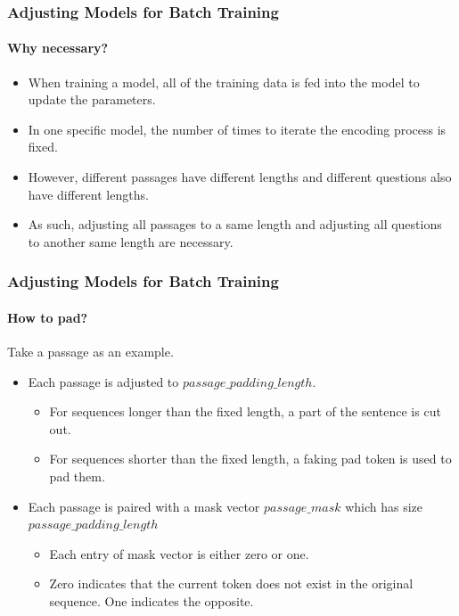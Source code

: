 \documentclass{beamer}
\begin{document}
\begin{frame} \frametitle{Adjusting Models for Batch Training}\framesubtitle{Why necessary?}
    \begin{itemize}
        \item When training a model, all of the training data is fed into the model to update the parameters.
        \item In one specific model, the number of times to iterate the encoding process is fixed.
        \item However, different passages have different lengths and different questions also have different lengths.
        \item As such, adjusting all passages to a same length and adjusting all questions to another same length are necessary.
    \end{itemize}
\end{frame}

\begin{frame}\frametitle{Adjusting Models for Batch Training}\framesubtitle{How to pad?}
Take a passage as an example.
    \begin{itemize}
        \item Each passage is adjusted to $passage\_padding\_length$.
            \begin{itemize}
                \item For sequences longer than the fixed length, a part of the sentence is cut out.
                \item For sequences shorter than the fixed length, a faking pad token is used to pad them.
            \end{itemize}
        \item Each passage is paired with a mask vector $passage\_mask$ which has size $passage\_padding\_length$
            \begin{itemize}
                \item Each entry of mask vector is either zero or one. \item Zero indicates that the current token does not exist in the original sequence. One indicates the opposite.
            \end{itemize}
    \end{itemize}
\end{frame}
\end{document}
